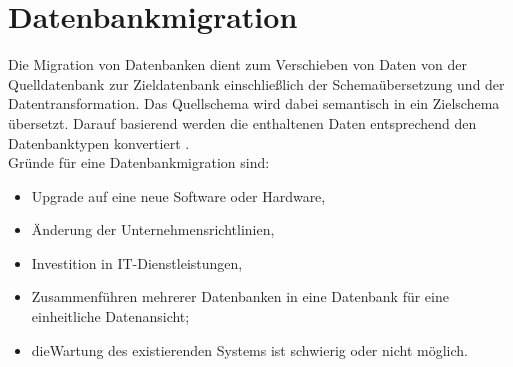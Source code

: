 \section{Datenbankmigration}
\label{sect:dbmigration}
Die Migration von Datenbanken dient zum Verschieben von Daten von der Quelldatenbank zur Zieldatenbank einschließlich der Schemaübersetzung und der Datentransformation. Das Quellschema wird dabei semantisch in ein Zielschema übersetzt. Darauf basierend werden die enthaltenen Daten entsprechend den Datenbanktypen konvertiert \cite{elamparithi2015review}. \\
Gründe für eine Datenbankmigration sind:
\begin{itemize}
	\item Upgrade auf eine neue Software oder Hardware,
	\item Änderung der Unternehmensrichtlinien,
	\item Investition in IT-Dienstleistungen,
	\item Zusammenführen mehrerer Datenbanken in eine Datenbank für eine einheitliche Datenansicht;
	\item dieWartung des existierenden Systems ist schwierig oder nicht möglich.
	
\end{itemize}
	

